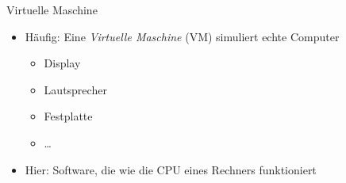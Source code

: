 \begin{frame}{Virtuelle Maschine}
	\begin{itemize}
		\item<1-> Häufig: Eine \emph{Virtuelle Maschine} (VM) simuliert echte Computer
			\begin{itemize}
				\item Display
				\item Lautsprecher
				\item Festplatte
				\item \dots
			\end{itemize}
		\item<2-> Hier: Software, die wie die CPU eines Rechners funktioniert
	\end{itemize}
\end{frame}

